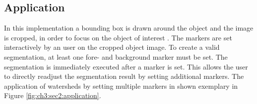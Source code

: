 \subsection{Application}\label{ord:ch3:sec2:subsec2}
In this implementation a bounding box is drawn around the object and the image is cropped, in order to focus on the object of interest .
The markers are set interactively by an user on the cropped object image.
To create a valid segmentation, at least one fore- and background marker must be set.
The segmentation is immediately executed after a marker is set.
This allows the user to directly readjust the segmentation result by setting additional markers.
The application of watersheds by setting multiple markers in shown exemplary in Figure \ref{fig:ch3:sec2:application}.


